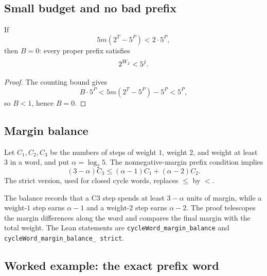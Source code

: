 \subsection{Small budget and no bad prefix}

\begin{corollary}
If
\begin{equation*}
  5m\left(2^T-5^P\right)<2\cdot5^P,
\end{equation*}
then $B=0$: every proper prefix satisfies
\begin{equation*}
  2^{W_j}<5^j.
\end{equation*}
\end{corollary}

\begin{proof}
The counting bound gives
\begin{equation*}
  B\cdot5^P<5m\left(2^T-5^P\right)-5^P<5^P,
\end{equation*}
so $B<1$, hence $B=0$.
\end{proof}

\subsection{Margin balance}

Let $C_1,C_2,C_3$ be the numbers of steps of weight $1$, weight $2$,
and weight at least $3$ in a word, and put $\alpha=\log_2 5$.  The
nonnegative-margin prefix condition implies
\begin{equation*}
  (3-\alpha)C_3\le(\alpha-1)C_1+(\alpha-2)C_2.
\end{equation*}
The strict version, used for closed cycle words, replaces $\le$ by
$<$.

The balance records that a C3 step spends at least $3-\alpha$ units of
margin, while a weight-$1$ step earns $\alpha-1$ and a weight-$2$
step earns $\alpha-2$.  The proof telescopes the margin differences
along the word and compares the final margin with the total weight.
The Lean statements are
\texttt{cycleWord\_\allowbreak margin\_\allowbreak balance} and
\texttt{cycleWord\_\allowbreak margin\_\allowbreak balance\_\allowbreak
strict}.

\subsection{Worked example: the exact prefix word}

